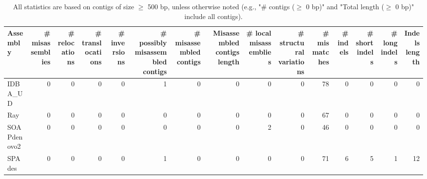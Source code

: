 \documentclass[12pt,a4paper]{article}
\begin{document}
\begin{table}[ht]
\begin{center}
\caption{All statistics are based on contigs of size $\geq$ 500 bp, unless otherwise noted (e.g., "\# contigs ($\geq$ 0 bp)" and "Total length ($\geq$ 0 bp)" include all contigs).}
\begin{tabular}{|l*{14}{|r}|}
\hline
Assembly & \# misassemblies &     \# relocations &     \# translocations &     \# inversions & \# possibly misassembled contigs & \# misassembled contigs & Misassembled contigs length & \# local misassemblies & \# structural variations & \# mismatches & \# indels &     \# short indels &     \# long indels & Indels length \\ \hline
IDBA\_UD & 0 & 0 & 0 & 0 & 1 & 0 & 0 & 0 & 0 & 78 & 0 & 0 & 0 & 0 \\ \hline
Ray & 0 & 0 & 0 & 0 & 0 & 0 & 0 & 0 & 0 & 67 & 0 & 0 & 0 & 0 \\ \hline
SOAPdenovo2 & 0 & 0 & 0 & 0 & 0 & 0 & 0 & 2 & 0 & 46 & 0 & 0 & 0 & 0 \\ \hline
SPAdes & 0 & 0 & 0 & 0 & 1 & 0 & 0 & 0 & 0 & 71 & 6 & 5 & 1 & 12 \\ \hline
\end{tabular}
\end{center}
\end{table}
\end{document}
